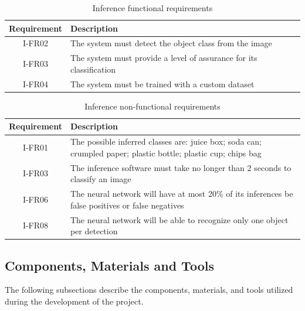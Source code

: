 \documentclass[a4paper,11pt]{article}
\begin{document}
\begin{table}[H]
  \caption{\small{Inference functional requirements}}
  \begin{center}
    \begin{tabular}{|c|p{95mm}|}
      \hline
      Requirement & Description                                                         \\ \hline
      I-FR02      & The system must detect the object class from the image              \\ \hline
      I-FR03      & The system must provide a level of assurance for its classification \\ \hline
      I-FR04      & The system must be trained with a custom dataset                    \\ \hline
    \end{tabular}
  \end{center}
  \label{tab:Inf0}
\end{table}

\begin{table}[H]
  \caption{\small{Inference non-functional requirements}}
  \begin{center}
    \begin{tabular}{|c|p{95mm}|}
      \hline
      Requirement & Description                                                                                                    \\ \hline
      I-FR01      & The possible inferred classes are: juice box; soda can; crumpled paper; plastic bottle; plastic cup; chips bag \\ \hline
      I-FR03      & The inference software must take no longer than 2 seconds to classify an image                                 \\ \hline
      I-FR06      & The neural network will have at most 20\% of its inferences be false positives or false negatives              \\ \hline
      I-FR08      & The neural network will be able to recognize only one object per detection                                     \\ \hline
      \hline
    \end{tabular}
  \end{center}
  \label{tab:Inf1}
\end{table}

\subsection{Components, Materials and Tools}
The following subsections describe the components, materials, and tools utilized during the development of the project.
\end{document}
